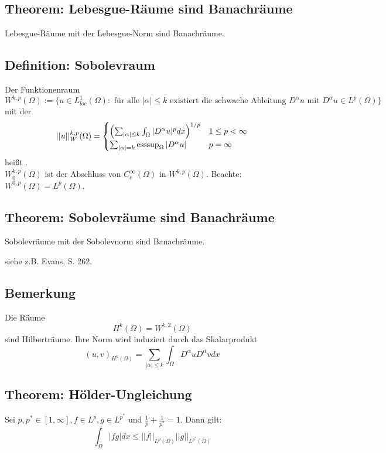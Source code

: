 \subsection{Theorem: Lebesgue-Räume sind Banachräume}
	Lebesgue-Räume mit der Lebesgue-Norm sind Banachräume.
	
\subsection{Definition: Sobolevraum}
\label{def:sobolevraum} \label{def_56}
	Der Funktionenraum \marginnote{[56]}
	\[ W^{k,p}(\Omega) := \{ u \in L_{loc}^1(\Omega) : \text{ für alle } |\alpha| \leq k \text{ existiert  die schwache Ableitung } D^\alpha u \text{ mit } D^\alpha u \in L^p(\Omega) \} \]
	mit der 
	\[ ||u||_W^{k,p}(\Omega) = \begin{cases}
		\enbrace*{ \sum_{|\alpha| \leq k} \int_{\Omega} |D^\alpha u|^p dx}^{1/p} & 1 \leq p < \infty \\
		\sum_{|\alpha| = k } \esssup_\Omega |D^\alpha u| & p = \infty \end{cases} \]
	heißt . \\
	$W_0^{k,p}(\Omega)$ ist der Abschluss von $C_c^\infty(\Omega)$ in $W^{k,p}(\Omega)$. Beachte: $W^{0,p}(\Omega) = L^p(\Omega)$.

\subsection{Theorem: Sobolevräume sind Banachräume}
\label{thm_57}
	Sobolevräume mit der Sobolevnorm sind Banachräume. \marginnote{[57]}
	
	siehe z.B. Evans, S. 262.
	
\subsection{Bemerkung}
\label{bem_58}
	Die Räume \marginnote{[58]}
	\[ H^k(\Omega) = W^{k,2}(\Omega) \]
	sind Hilberträume. Ihre Norm wird induziert durch das Skalarprodukt
	\[ (u,v)_{H^k(\Omega)} = \sum_{|\alpha| \leq k} \int_{\Omega} D^\alpha u D^\alpha v dx \] 

\subsection{Theorem: Hölder-Ungleichung}
\label{hoelder_ungl} \label{thm_59}
	Sei $p, p^* \in [1,\infty], f \in L^p, g \in L^{p^*}$ und $\frac{1}{p} + \frac{1}{p^*} = 1$. Dann gilt: \marginnote{[59]}
	\[ \int_{\Omega} |fg|dx \leq ||f||_{L^p(\Omega)} ||g||_{L^{p^*}(\Omega)} \]
	
